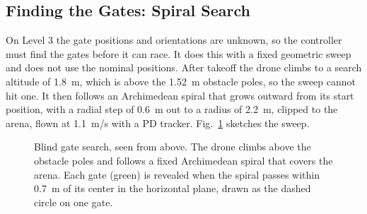 \documentclass[conference]{IEEEtran}
\begin{document}
\subsection{Finding the Gates: Spiral Search}
\label{sec:search}
On Level 3 the gate positions and orientations are unknown, so the controller must find the gates before it can race. It does this with a fixed geometric sweep and does not use the nominal positions. After takeoff the drone climbs to a search altitude of 1.8~m, which is above the 1.52~m obstacle poles, so the sweep cannot hit one. It then follows an Archimedean spiral that grows outward from its start position, with a radial step of 0.6~m out to a radius of 2.2~m, clipped to the arena, flown at 1.1~m/s with a PD tracker. Fig.~\ref{fig:spiral} sketches the sweep.

\begin{figure}[t]
\centering
{}
\caption{Blind gate search, seen from above. The drone climbs above the obstacle poles and follows a fixed Archimedean spiral that covers the arena. Each gate (green) is revealed when the spiral passes within 0.7~m of its center in the horizontal plane, drawn as the dashed circle on one gate.}
\label{fig:spiral}
\end{figure}
\end{document}
